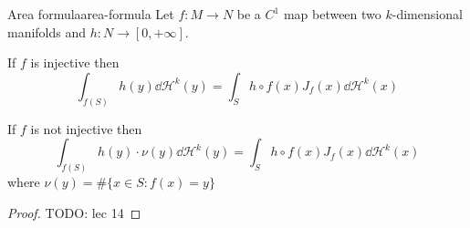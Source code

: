 \documentclass[12pt]{extarticle}
\begin{document}
\begin{theorem}{Area formula}{area-formula}
	Let $f: M \to N$ be a $C^1$ map between two $k$-dimensional manifolds and
	$h : N \to [0, + \infty]$.

	If $f$ is injective then
	\begin{equation}
		\int_{f(S)} h(y) \dd \mathcal H^k(y) = \int_S h \circ f(x) J_f(x) \dd \mathcal H^k(x)
	\end{equation}

	If $f$ is not injective then
	\begin{equation}
		\int_{f(S)} h(y) \cdot \nu(y) \dd \mathcal H^k(y) = \int_S h \circ f(x) J_f(x) \dd \mathcal H^k(x)
	\end{equation}
	where $\nu(y) = \# \{ x \in S : f(x) = y\}$
\end{theorem}

\begin{proof}
	TODO: lec 14
\end{proof}
\end{document}
